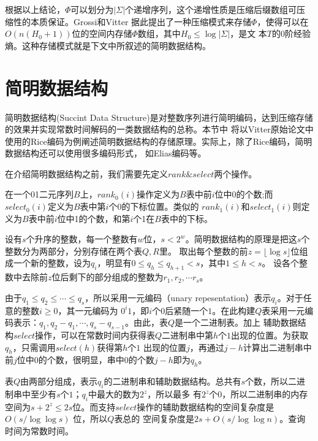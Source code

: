 根据以上结论，$\Phi$可以划分为$|\Sigma|$个递增序列，这个递增性质是压缩后缀数组可压缩性的本质保证。Grossi和Vitter\cite{grossi2005compressed}
据此提出了一种压缩模式来存储$\Phi$，使得可以在$O(n(H_0+1))$位的空间内存储$\Phi$数组，其中$H_0 \leq \log |\Sigma|$，是文
本$T$的0阶经验熵。这种存储模式就是下文中所叙述的简明数据结构。

\section{简明数据结构}

简明数据结构(Succint Data Structure)\cite{jacobson1988succinct}是对整数序列进行简明编码，达到压缩存储的效果并实现常数时间解码的一类数据结构的总称。本节中
将以Vitter原始论文中使用的Rice编码为例阐述简明数据结构的存储原理。实际上，除了Rice编码，简明数据结构还可以使用很多编码形式，
如Elias编码\cite{witten1999managing}等。

在介绍简明数据结构之前，我们需要先定义$rank\&select$两个操作。

\begin{defn}\label{def:rank}
在一个01二元序列$B$上，$rank_0(i)$操作定义为$B$表中前$i$位中0的个数;而$select_0(i)$定义为$B$表中第$i$个0的下标位置。类似的
$rank_1(i)$和$select_1(i)$则定义为$B$表中前$i$位中1的个数，和第$i$个1在$B$表中的下标。
\end{defn}

设有$s$个升序的整数，每一个整数有$w$位，$s<2^w$。简明数据结构的原理是把这$s$个整数分为两部分，分别存储在两个表$Q,R$里。
取出每个整数的前$z=\lfloor \log s\rfloor $位组成一个新的整数，设为$q_i$，明显有$0 \leq q_h \leq q_{h+1} < s$，其中$1 \leq h < s$。
设各个整数中去除前$z$位后剩下的部分组成的整数为$r_1,r_2,\cdots r_s$。

由于$q_1 \leq q_2 \leq \cdots \leq q_s$，所以采用一元编码（unary repesentation）表示$q_i$。对于任意的整数$i \geq 0$，其一元编码为
$0^i1$，即$i$个$0$后紧随一个$1$。在此构建$Q$表采用一元编码表示：$q_1,q_2-q_1,\cdots ,q_s-q_{s-1}$。由此，表$Q$是一个二进制表。加上
辅助数据结构$select$操作，可以在常数时间内获得表$Q$二进制串中第$h$个$1$出现的位置。为获取$q_h$，只需调用$select(h)$获得第$h$个$1$
出现的位置$j$，再通过$j-h$计算出二进制串中前$j$位中$0$的个数，很明显，串中$0$的个数$j-h$即为$q_h$。

表$Q$由两部分组成，表示$q_i$的二进制串和辅助数据结构。总共有$s$个数，所以二进制串中至少有$s$个$1$；$q_i$中最大的数为$2^z$，所以最多
有$2^z$个$0$，所以二进制串的内存空间为$s+2^z \leq 2s$位。而支持$select$操作的辅助数据结构的空间复杂度是$O(s/\log \log s)$ 位，所以$Q$表总的
空间复杂度是$2s+O(s/\log \log n)$。查询时间为常数时间。

